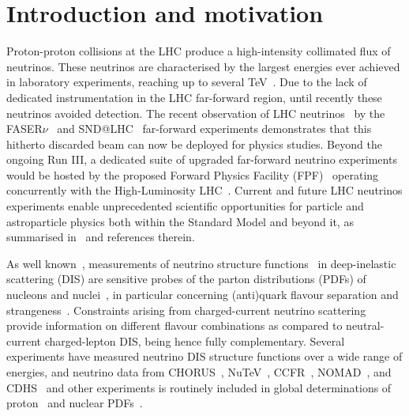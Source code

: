 \section{Introduction and motivation}
\label{sec:introduction}

Proton-proton collisions at the LHC produce a high-intensity collimated flux of neutrinos.
%
These neutrinos are characterised by the largest energies ever achieved in laboratory experiments,
reaching up to several TeV~\cite{Kling:2021gos}.
%
Due to the lack of dedicated instrumentation in the LHC far-forward region,
until recently these neutrinos avoided detection.
%
The recent observation of LHC neutrinos~\cite{FASER:2023zcr,SNDLHC:2023pun} by the
  FASER$\nu$~\cite{FASER:2019dxq} and SND@LHC~\cite{SHiP:2020sos,SNDLHC:2022ihg} far-forward experiments
demonstrates that this hitherto discarded beam can now be deployed for physics studies.
%
Beyond the ongoing Run III, a dedicated suite of upgraded far-forward
neutrino experiments would be hosted by the proposed
Forward Physics Facility (FPF)~\cite{Anchordoqui:2021ghd,Feng:2022inv} operating
concurrently with the High-Luminosity LHC~\cite{Azzi:2019yne,Cepeda:2019klc}.
%
Current and future LHC neutrinos experiments enable unprecedented scientific opportunities
for particle and astroparticle physics both within the Standard Model and beyond it,
as summarised in~\cite{Anchordoqui:2021ghd,Feng:2022inv}
and references therein.

As well known~\cite{Conrad:1997ne,Mangano:2001mj},
measurements of neutrino structure functions~\cite{Candido:2023utz} in deep-inelastic scattering
(DIS) are sensitive probes of the parton distributions (PDFs)
of nucleons and nuclei~\cite{Ethier:2020way,Gao:2017yyd,Kovarik:2019xvh},  in particular
concerning (anti)quark  flavour separation and
strangeness~\cite{NuTeV:2007uwm,CCFR:1994ikl,Faura:2020oom,Alekhin:2014sya}.
%
Constraints arising from charged-current neutrino scattering provide information on
different flavour combinations as compared to neutral-current charged-lepton DIS,
being hence fully complementary.
%
Several  experiments have measured neutrino
DIS structure functions over a wide range of energies, and neutrino data
from CHORUS~\cite{CHORUS:2005cpn}, NuTeV~\cite{NuTeV:2001dfo},
CCFR~\cite{Yang:2000ju}, NOMAD~\cite{NOMAD:2013hbk}, and CDHS~\cite{Berge:1989hr}
and other experiments is routinely  included in global
determinations of proton~\cite{NNPDF:2021njg,Hou:2019efy,Bailey:2020ooq} and nuclear
PDFs~\cite{Eskola:2021nhw,AbdulKhalek:2022fyi,Muzakka:2022wey}.

